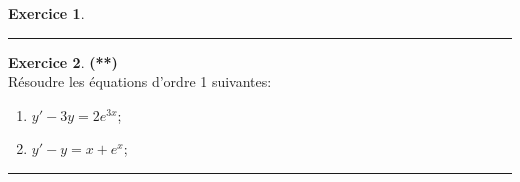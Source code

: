 \documentclass[a4paper,11pt]{article}
\theoremstyle{definition}
\newtheorem{exo}{Exercice} %
\begin{document}
\begin{minipage}{1\linewidth}
\begin{minipage}[t]{0.48\linewidth}
\begin{exo}
	\centering
	\rule{1\linewidth}{0.6pt}
\end{exo}
		
		
\begin{exo}\textbf{(**)}\quad\\[0.2cm]
	Résoudre les équations d’ordre 1 suivantes:
	\begin{multicols}{2}
		\begin{enumerate}
\item $y' - 3y = 2e^{3x}$;
\item $y' - y = x + e^{x}$;
		\end{enumerate}
	
	\end{multicols}
	\centering
	\rule{1\linewidth}{0.6pt}
\end{exo}		

	
		
		
	\end{minipage}
\end{minipage}
\end{document}
